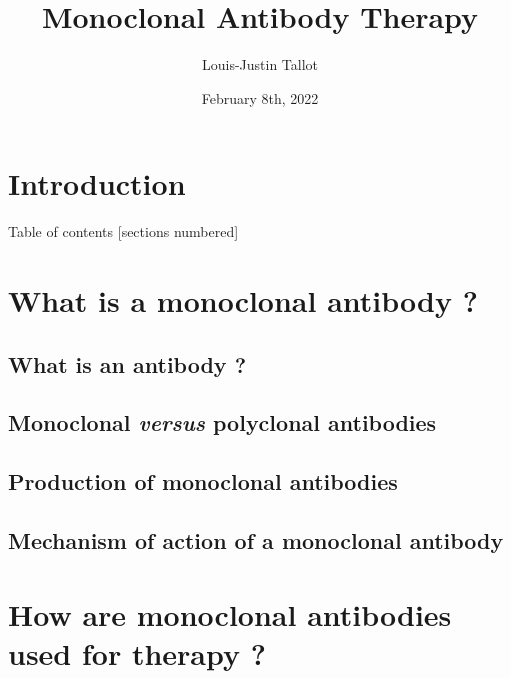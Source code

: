 \documentclass{beamer}
\title{
  \textbf{Monoclonal Antibody Therapy}
}
\author{Louis-Justin Tallot}
\date{February 8th, 2022}
\begin{document}
  \maketitle





  \section*{Introduction}
  

  \begin{frame}{Table of contents}
    [sections numbered]
    \tableofcontents
  \end{frame}

  \section{What is a monoclonal antibody ?}

    \subsection{What is an antibody ?}
    

    \subsection{Monoclonal \textit{versus} polyclonal antibodies}
    

    \subsection{Production of monoclonal antibodies}
    

    \subsection{Mechanism of action of a monoclonal antibody}
    

  \section{How are monoclonal antibodies used for therapy ?}

\end{document}
